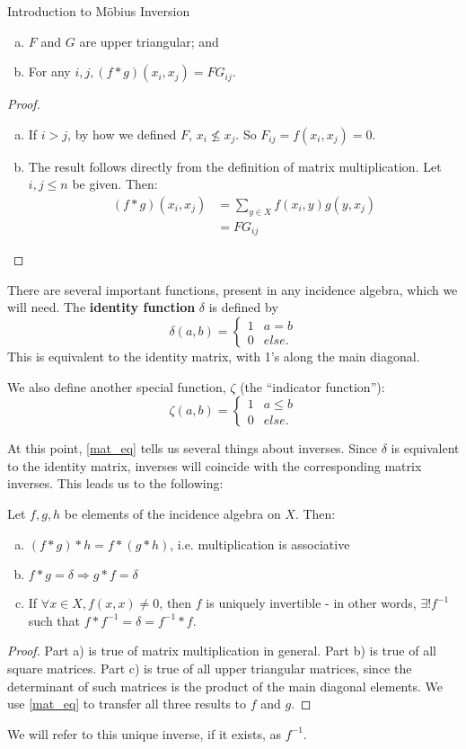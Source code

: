 \documentclass[12pt]{pom_thesis}
\begin{document}
\begin{chapter}{Introduction to M\"obius Inversion}
\begin{lemma}
\begin{enumerate}[a)]
\item $F$ and $G$ are upper triangular; and
\item For any $i,j, (f * g)(x_i, x_j)=FG_{ij}$.
\end{enumerate}
\end{lemma}
\begin{proof}
\begin{enumerate}[a)]
\item If $i>j$, by how we defined $F$, $x_i \nleq x_j$. So $F_{ij} = f(x_i, x_j) = 0$. 
\item
The result follows directly from the definition of matrix multiplication. Let $i,j\leq n$ be given. Then:
\begin{align*}
(f * g)(x_i, x_j) &= \sum_{y \in X} f(x_i,y)g(y,x_j)\\
&=FG_{ij}
\end{align*}
\end{enumerate}
\end{proof}


There are several important functions, present in any incidence algebra, which we will need. 
The \textbf{identity function} $\delta$ is defined by 
\[\delta(a,b) = \begin{cases} 1 & a = b \\ 0 & else. \end{cases}
\]
This is equivalent to the identity matrix, with 1's along the main diagonal.

We also define another special function, $\zeta$ (the ``indicator function''):
\[
\zeta(a,b) = \begin{cases} 1 & a \leq b \\ 0 & else. \end{cases}
\]

At this point, \ref{mat_eq} tells us several things about inverses. Since $\delta$ is equivalent to the identity matrix, inverses will coincide with the corresponding matrix inverses. This leads us to the following:
\begin{cor}\label{cor_inv}
Let $f,g, h$ be elements of the incidence algebra on $X$. Then:
\begin{enumerate}[a)]
\item $(f*g)*h = f*(g*h)$, i.e. multiplication is associative
\item $f*g = \delta \Rightarrow g*f = \delta$
\item If $\forall x \in X, f(x,x) \neq 0$, then $f$ is uniquely invertible - in other words, $\exists! f^{-1}$ such that $f*f^{-1} = \delta = f^{-1} * f$.
\end{enumerate}
\end{cor}
\begin{proof}
Part a) is true of matrix multiplication in general. Part b) is true of all square matrices. Part c) is true of all upper triangular matrices, since the determinant of such matrices is the product of the main diagonal elements. We use \ref{mat_eq} to transfer all three results to $f$ and $g$.
\end{proof}
We will refer to this unique inverse, if it exists, as $f^{-1}$. 



\end{chapter}
\end{document}
